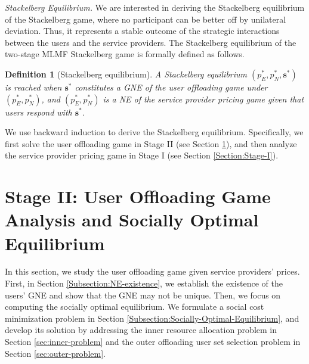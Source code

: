 \documentclass[lettersize,journal]{IEEEtran}
\newtheorem{definition}{Definition}
\begin{document}
\emph{Stackelberg Equilibrium.}
 We are interested in deriving the Stackelberg equilibrium of the Stackelberg game, where no participant can be better off by unilateral deviation. Thus, it represents a stable outcome of the strategic interactions between the users and the service providers. The Stackelberg equilibrium of the two-stage MLMF Stackelberg game is formally defined as follows.
\begin{definition}[Stackelberg equilibrium]\label{def:Stackelberg-eq}
    A Stackelberg equilibrium $(p^*_E, p^*_N, \boldsymbol{s}^*)$ is reached when $\boldsymbol{s}^*$ constitutes a GNE of the user offloading game under $(p^*_E, p^*_N)$, and $(p^*_E, p^*_N)$ is a NE of the service provider pricing game given that users respond with $\boldsymbol{s}^*$.

\end{definition}
We use backward induction to derive the Stackelberg equilibrium. Specifically, we first solve the user offloading game in Stage II (see Section \ref{section:stage-II}), and then analyze the service provider pricing game in Stage I (see Section \ref{Section:Stage-I}).


\section{Stage II: User Offloading Game Analysis and Socially Optimal Equilibrium}\label{section:stage-II}
In this section, we study the user offloading game given service providers' prices. First, in Section \ref{Subsection:NE-existence}, we establish the existence of the users' GNE and show that the GNE may not be unique. 
Then, we focus on computing the socially optimal equilibrium. We formulate a social cost minimization problem in Section \ref{Subsection:Socially-Optimal-Equilibrium}, and develop its solution by addressing the inner resource allocation problem in Section \ref{sec:inner-problem} and the outer offloading user set selection problem in Section \ref{sec:outer-problem}.
\end{document}
